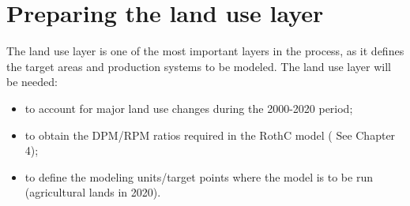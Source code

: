 \documentclass[
  10pt,
  b5paper,
]{book}
\providecommand{\tightlist}{%
  \setlength{\itemsep}{0pt}\setlength{\parskip}{0pt}}
\begin{document}
\hypertarget{preparing-the-land-use-layer}{%
\section{Preparing the land use layer}\label{preparing-the-land-use-layer}}

The land use layer is one of the most important layers in the process, as it defines the target areas and production systems to be modeled.
The land use layer will be needed:

\begin{itemize}
\tightlist
\item
  to account for major land use changes during the 2000-2020 period;
\item
  to obtain the DPM/RPM ratios required in the RothC model ( See Chapter 4);
\item
  to define the modeling units/target points where the model is to be run (agricultural lands in 2020).
\end{itemize}
\end{document}
